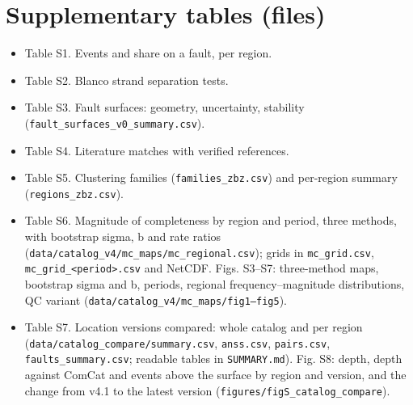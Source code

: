 \documentclass[11pt]{article}
\providecommand{\tightlist}{\setlength{\itemsep}{0pt}\setlength{\parskip}{0pt}}
\begin{document}
\section{Supplementary tables (files)}\label{supplementary-tables-files}

\begin{itemize}
\tightlist
\item
  Table S1. Events and share on a fault, per region.
\item
  Table S2. Blanco strand separation tests.
\item
  Table S3. Fault surfaces: geometry, uncertainty, stability
  (\texttt{fault\_surfaces\_v0\_summary.csv}).
\item
  Table S4. Literature matches with verified references.
\item
  Table S5. Clustering families (\texttt{families\_zbz.csv}) and
  per-region summary (\texttt{regions\_zbz.csv}).
\item
  Table S6. Magnitude of completeness by region and period, three
  methods, with bootstrap sigma, b and rate ratios
  (\texttt{data/catalog\_v4/mc\_maps/mc\_regional.csv}); grids in
  \texttt{mc\_grid.csv},
  \texttt{mc\_grid\_\textless{}period\textgreater{}.csv} and NetCDF.
  Figs. S3--S7: three-method maps, bootstrap sigma and b, periods,
  regional frequency--magnitude distributions, QC variant
  (\texttt{data/catalog\_v4/mc\_maps/fig1--fig5}).
\item
  Table S7. Location versions compared: whole catalog and per region
  (\texttt{data/catalog\_compare/summary.csv}, \texttt{anss.csv},
  \texttt{pairs.csv}, \texttt{faults\_summary.csv}; readable tables in
  \texttt{SUMMARY.md}). Fig. S8: depth, depth against ComCat and events
  above the surface by region and version, and the change from v4.1 to
  the latest version (\texttt{figures/figS\_catalog\_compare}).
\end{itemize}



\end{document}

